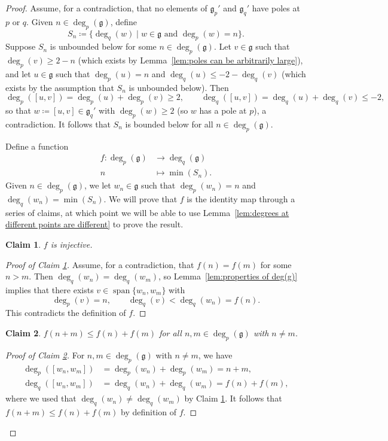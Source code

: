 \documentclass[10pt,a4paper]{amsart}
\newtheorem{claim}{Claim}
\def\g{\mathfrak{g}}
\DeclareMathOperator{\spn}{span}
\begin{document}
\begin{proof}
    Assume, for a contradiction, that no elements of $\g_p'$ and $\g_q'$ have poles at $p$ or $q$. Given $n \in \deg_p(\g)$, define
    $$S_n \coloneqq \{\deg_q(w) \mid w \in \g \text{ and } \deg_p(w) = n\}.$$
    Suppose $S_n$ is unbounded below for some $n \in \deg_p(\g)$. Let $v \in \g$ such that $\deg_p(v) \geq 2 - n$ (which exists by Lemma~\ref{lem:poles can be arbitrarily large}), and let $u \in \g$ such that $\deg_p(u) = n$ and $\deg_q(u) \leq -2 - \deg_q(v)$ (which exists by the assumption that $S_n$ is unbounded below). Then
    $$\deg_p([u,v]) = \deg_p(u) + \deg_p(v) \geq 2, \qquad \deg_q([u,v]) = \deg_q(u) + \deg_q(v) \leq -2,$$
    so that $w \coloneqq [u,v] \in \g_q'$ with $\deg_p(w) \geq 2$ (so $w$ has a pole at $p$), a contradiction. It follows that $S_n$ is bounded below for all $n \in \deg_p(\g)$.

    Define a function
    \begin{align*}
        f \colon \deg_p(\g) &\to \deg_q(\g) \\
        n &\mapsto \min(S_n).
    \end{align*}
    Given $n \in \deg_p(\g)$, we let $w_n \in \g$ such that $\deg_p(w_n) = n$ and $\deg_q(w_n) = \min(S_n)$. We will prove that $f$ is the identity map through a series of claims, at which point we will be able to use Lemma~\ref{lem:degrees at different points are different} to prove the result.

    \begin{claim}\label{claim:f is injective}
        $f$ is injective.
    \end{claim}
    \begin{proof}[Proof of Claim \ref{claim:f is injective}]
        Assume, for a contradiction, that $f(n) = f(m)$ for some $n > m$. Then $\deg_q(w_n) = \deg_q(w_m)$, so Lemma~\ref{lem:properties of deg(g)} implies that there exists $v \in \spn\{w_n,w_m\}$ with
        $$\deg_p(v) = n, \qquad \deg_q(v) < \deg_q(w_n) = f(n).$$
        This contradicts the definition of $f$.
    \end{proof}

    \begin{claim}\label{claim:f is sub-additive}
        $f(n + m) \leq f(n) + f(m)$ for all $n,m \in \deg_p(\g)$ with $n \neq m$.
    \end{claim}
    \begin{proof}[Proof of Claim \ref{claim:f is sub-additive}]
        For $n,m \in \deg_p(\g)$ with $n \neq m$, we have
        \begin{align*}
            \deg_p([w_n,w_m]) &= \deg_p(w_n) + \deg_p(w_m) = n + m, \\
            \deg_q([w_n,w_m]) &= \deg_q(w_n) + \deg_q(w_m) = f(n) + f(m),
        \end{align*}
        where we used that $\deg_q(w_n) \neq \deg_q(w_m)$ by Claim \ref{claim:f is injective}. It follows that $f(n + m) \leq f(n) + f(m)$ by definition of $f$.
    \end{proof}


\end{proof}
\end{document}
